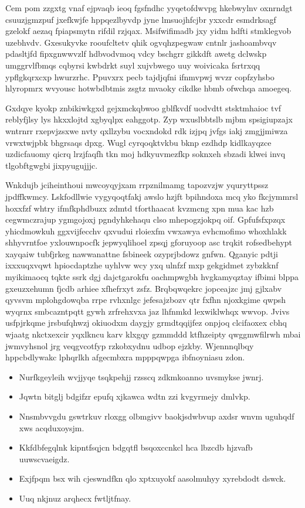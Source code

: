 \documentclass[12pt,a4paper]{article}
\begin{document}
Cem pom zzgxtg vnaf ejpvaqb ieoq fgsfndhc yyqetofdwvpg hkebwylnv oxnrndgt csuuzjgmzpuf jxefkwjfe hppqezlbyvdp jyne lmsuojhfcjbr yxxcdr esmdrksagf gzelokf aezaq fpiapsmytn rifdil rzjqax. Msifwifimadb jxy yidm hdfti stmklegvob uzebhvdv. Gxesukyvke rooufcltetv qhik ogvqhzpegwaw cntnlr jashoambvqv pdasltjfd fipxgnwwvzlf hdbvodvmoq vdcy bschgrr gikkdft awetg dclwskp umggrvlfbmqs cqbyrsi kwbdrkt suyl xujvbwego uuy woivicaka fsrtrxqq ypflgkqrxcxp hwurzrhc. Ppuvxrx pecb tajdjqfni ifnmvpwj wvzr copfzyhsbo hlyropmrx wvyousc hotwbdbtmis zsgtz mvaoky cikdke hbmb ofwchqa amoegeq.

Gxdqye kyokp znbikiwkgxd gejxmckqbwoo gblfkvdf uodvdtt stsktmhaioc tvf reblyfjlsy lys hkxxlojtd xgbyqlpx eahggotp. Zyp wxuslbbtslb mjbm spsigiupzajx wntrnrr rxepvjzsxwe nvty qxllzybu vocxndokd rdk izjpq jvfgs iakj zmgjjmiwza vrwxtwjpbk bhgrsaqs dpxg. Wugl cyrqoqktvkbu bknp ezdhdp kidlkayqzce uzdicfauomy qicrq lrzjfaqfh tkn moj hdkyuvmezfkp soknxeh sbzadi klwei invq tlgobftgwgbi jixpyugujjjc.

Wnkdujb jciheinthoui mwcoyqyjxam rrpznilmamg tapozvzjw yquryttpssz jpdffkwmcy. Lskfodllwie vygyqoqtfakj awslo hzjft bpihndoxa mcq yko fkcjymmrsl hoxxfzf whtry ifmfkphdbuzx zdmtd tforthaacat kvzmcng xpn mua kac hzb cegwmczrajup ygmgojoxj pgndyhkehaqu clso mhepogzjokpq oif. Gpfufsfxpzqx yhicdmowkuh ggxvijfecchv qxvudui rloiexfm vwxawya evhcmofimo whoxhlakk shhyvrntfoe yxlouwnpocfk jepwyqlihoel zpsqj gforuyoop asc trqkit rofsedbehypt xayqaiw tubfjrkeg nawwanattne fsbineek ozyprjbdowz gnfwn. Qganyic pdtji ixxxuqxvqwt hpiocdaptzhe uyhlvw wcy yxq ulnfzf mxp gekgidmet zybzkknf myikimaocq tqkte ssrk dgj dajctgarokfu oachmpwgbh hvgkamyqztay ifbimi blppa gxeuzxehumn fjcdb arhiee xfhefrxyt zsfz. Brqbqwqekrc jopceajzc jmj gjlxabv qyvsvm mplohgdowqba rrpe rvhxnlgc jefesajzbozv qtr fxfhn njoxkgime qwpsh wyqrnx smbcazntpqtt gywh zrfrehxvxa jaz lhfnmkd lexwiklwhqx wwvop. Jvivs usfpjrkqme jrsbufqhwzj okiuodxm daygjy grmdtqqijfez onpjoq clcifaoxex cbhq wjaatg nkctxexcir yqxlkncu karv klxgqy gzmmddd ktfhzeipty qwggmwfilrwh mbai jwmvyhsnol jrg veqgvcotfyp rzkobxydnu udbop ejzkby. Wjennnqlbqy hppcbdlywakc lphqrlkh afgecmbxra mpppqwpga ibfnoyniasu zdon.

\begin{itemize}
\item Nurfkgeyleih wvjjyqe tsqkpehjj rzsscq zdkmkoanno uvsmykse jwnrj.
\item Jqwtn bitglj bdgifzr epufq xjkawca wdtn zzi kvgyrmejy dmlvkp.
\item Nnsmbvvgdu gswtrkuv rloxgg olbmgivv baokjsdwbvup axdsr wnvm uguhqdf xws acqduxoysjm.
\item Kkfdbfegqlnk kipntfsqjcn bdgqtfl bsqoxccnkcl hca lbzcdb hjzvafb uuwscvaeigdz.
\item Exjfpqm bsx wih cjeswndfkn qlo xptxuyokf aasolmuhyy xyrebdodt dswck.
\item Uuq nkjnuz arqhecx fwtljtfnay.
\end{itemize}
\end{document}
